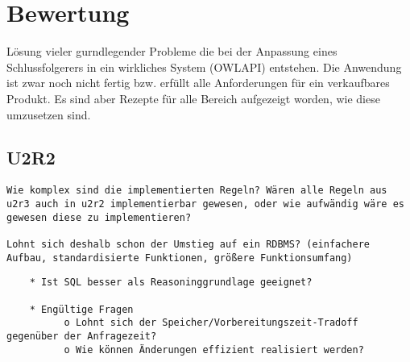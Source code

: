 \chapter{Bewertung}

Lösung vieler gurndlegender Probleme die bei der Anpassung eines Schlussfolgerers in ein wirkliches System (OWLAPI) entstehen. Die Anwendung ist zwar noch nicht fertig bzw. erfüllt alle Anforderungen für ein verkaufbares Produkt. Es sind aber Rezepte für alle Bereich aufgezeigt worden, wie diese umzusetzen sind.

\section{U2R2}
\begin{verbatim} 
Wie komplex sind die implementierten Regeln? Wären alle Regeln aus u2r3 auch in u2r2 implementierbar gewesen, oder wie aufwändig wäre es gewesen diese zu implementieren?

Lohnt sich deshalb schon der Umstieg auf ein RDBMS? (einfachere Aufbau, standardisierte Funktionen, größere Funktionsumfang) 
\end{verbatim}

\begin{verbatim}
    * Ist SQL besser als Reasoninggrundlage geeignet?

    * Engültige Fragen
          o Lohnt sich der Speicher/Vorbereitungszeit-Tradoff gegenüber der Anfragezeit?
          o Wie können Änderungen effizient realisiert werden? 
\end{verbatim}
